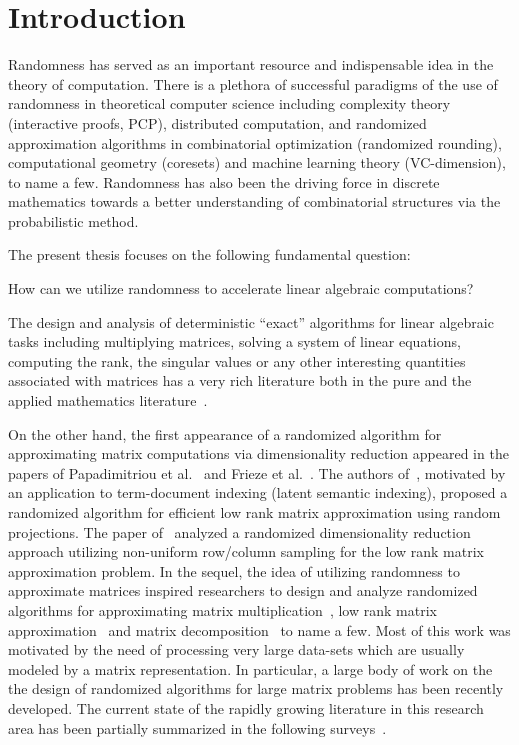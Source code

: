 \chapter{Introduction}\label{chap:intro}
%
Randomness has served as an important resource and indispensable idea in the theory of computation. There is a plethora of successful paradigms of the use of randomness in theoretical computer science including complexity theory (interactive proofs, PCP), distributed computation, and randomized approximation algorithms in combinatorial optimization (randomized rounding), computational geometry (coresets) and machine learning theory (VC-dimension), to name a few. Randomness has also been the driving force in discrete mathematics towards a better understanding of combinatorial structures via the probabilistic method.
%

%
The present thesis focuses on the following fundamental question:
\begin{center}
	How can we utilize randomness to accelerate linear algebraic computations?
\end{center}
%

%
The design and analysis of deterministic ``exact'' algorithms for linear algebraic tasks including multiplying matrices, solving a system of linear equations, computing the rank, the singular values or any other interesting quantities associated with matrices has a very rich literature both in the pure and the applied mathematics literature~\cite{book:Demmel,book:GVL}.
%

%
On the other hand, the first appearance of a randomized algorithm for approximating matrix computations via dimensionality reduction appeared in the papers of Papadimitriou et al.~\cite{LSI} and Frieze et al.~\cite{FKV98}. The authors of~\cite{LSI}, motivated by an application to term-document indexing (latent semantic indexing), proposed a randomized algorithm for efficient low rank matrix approximation using random projections. The paper of~\cite{FKV98} analyzed a randomized dimensionality reduction approach utilizing non-uniform row/column sampling for the low rank matrix approximation problem. In the sequel, the idea of utilizing randomness to approximate matrices inspired researchers to design and analyze randomized algorithms for approximating matrix multiplication~\cite{matrixmult:drineas}, low rank matrix approximation~\cite{lowrank:FKV,lowrank:drineas,lra:PNAS2007,HMT} and matrix decomposition~\cite{matrixdecomp:drineas} to name a few. Most of this work was motivated by the need of processing very large data-sets which are usually modeled by a matrix representation. In particular, a large body of work on the the design of randomized algorithms for large matrix problems has been recently developed. The current state of the rapidly growing literature in this research area has been partially summarized in the following surveys~\cite{book:Mahoney,book:spectral,HMT}.
%

